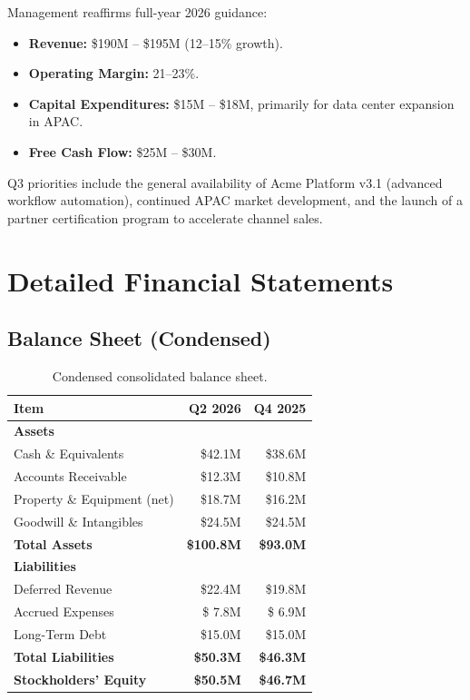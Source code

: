 \documentclass[
    language=english,
    doctype=quarterly-report,
    institution=none,
]{../../omnilatex}
\begin{document}
Management reaffirms full-year 2026 guidance:

\begin{itemize}
    \item \textbf{Revenue:} \$190M -- \$195M (12--15\% growth).
    \item \textbf{Operating Margin:} 21--23\%.
    \item \textbf{Capital Expenditures:} \$15M -- \$18M, primarily for data
          center expansion in APAC.
    \item \textbf{Free Cash Flow:} \$25M -- \$30M.
\end{itemize}

Q3 priorities include the general availability of Acme Platform v3.1
(advanced workflow automation), continued APAC market development, and the
launch of a partner certification program to accelerate channel sales.

\appendix
\section{Detailed Financial Statements}

\subsection{Balance Sheet (Condensed)}

\begin{table}[h]
    \centering
    \begin{tabular}{lrr}
        \toprule
        \textbf{Item} & \textbf{Q2 2026} & \textbf{Q4 2025} \\
        \midrule
        \textbf{Assets} & & \\
        \quad Cash \& Equivalents         & \$42.1M & \$38.6M \\
        \quad Accounts Receivable         & \$12.3M & \$10.8M \\
        \quad Property \& Equipment (net) & \$18.7M & \$16.2M \\
        \quad Goodwill \& Intangibles     & \$24.5M & \$24.5M \\
        \midrule
        \textbf{Total Assets}             & \textbf{\$100.8M} & \textbf{\$93.0M} \\
        \midrule
        \textbf{Liabilities} & & \\
        \quad Deferred Revenue             & \$22.4M & \$19.8M \\
        \quad Accrued Expenses             & \$ 7.8M & \$ 6.9M \\
        \quad Long-Term Debt               & \$15.0M & \$15.0M \\
        \midrule
        \textbf{Total Liabilities}        & \textbf{\$50.3M} & \textbf{\$46.3M} \\
        \midrule
        \textbf{Stockholders' Equity}     & \textbf{\$50.5M} & \textbf{\$46.7M} \\
        \bottomrule
    \end{tabular}
    \caption{Condensed consolidated balance sheet.}
\end{table}
\end{document}
